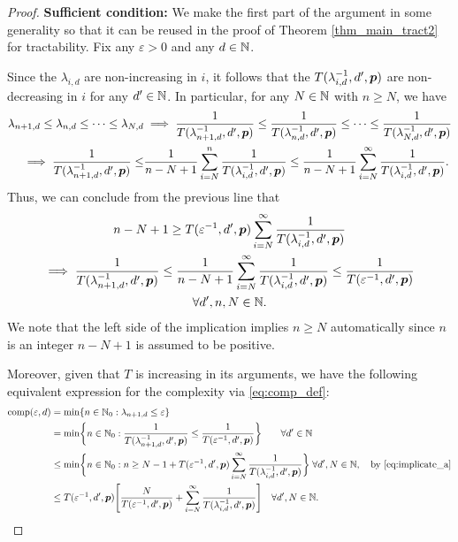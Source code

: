 \documentclass[11pt,a4paper]{article}
\begin{document}
\begin{proof}
\textbf{Sufficient condition:}\newline
We make the first part of the argument in some generality so that it can be reused in the proof of Theorem \ref{thm_main_tract2} for tractability.  Fix any $\varepsilon > 0$ and any $d \in \mathbb{N}$.

Since the $\lambda_{i,d}$ are non-increasing in $i$, it follows that the $T(\lambda_{i,d}^{-1},d',\boldsymbol{p})$ are non-decreasing in $i$ for any $d'\in\mathbb{N}$. In particular, for  any $N\in\mathbb{N}$ with $n\ge N$, we have
\begin{align*}
    \lambda_{n+1,d} \le \lambda_{n,d} \le \cdots \le \lambda_{N,d}
    & \implies \frac{1}{T(\lambda_{n+1, d}^{-1},d',\boldsymbol{p})} \le \frac{1}{T(\lambda_{n, d}^{-1},d',\boldsymbol{p})} \le \cdots \le \frac{1}{T(\lambda_{N, d}^{-1},d',\boldsymbol{p})} \\
     \implies \frac{1}{T(\lambda_{n+1, d}^{-1},d',\boldsymbol{p}) }
    \le &\frac{1}{n-N+1} \sum_{i=N}^n  \frac{1}{T(\lambda_{i, d}^{-1},d',\boldsymbol{p}) }
    \le \frac{1}{n-N+1} \sum_{i=N}^\infty  \frac{1}{T(\lambda_{i, d}^{-1},d',\boldsymbol{p})}.
\end{align*}
Thus, we can conclude from the previous line that
\begin{multline} \label{eq:implicate_a}
    n - N +1 \ge T(\varepsilon^{-1},d',\boldsymbol{p}) \sum_{i=N}^\infty \frac{1}{T(\lambda_{i, d}^{-1},d',\boldsymbol{p})} \\
   \implies   \frac{1}{T(\lambda_{n+1, d}^{-1},d',\boldsymbol{p})} \le
   \frac{1}{n-N+1} \sum_{i=N}^\infty \frac{1}{T(\lambda_{i, d}^{-1},d',\boldsymbol{p}) } \le \frac{1}{T(\varepsilon^{-1},d',\boldsymbol{p})} \\ \forall d', n, N \in \mathbb{N}.
\end{multline}
We note that the left side of the implication implies $n \ge N$ automatically since $n$ is an integer  $n - N +1$ is assumed to be positive.

Moreover, given that $T$ is increasing in its arguments, we have the following equivalent expression for the complexity via \eqref{eq:comp_def}:
\begin{align} %
	\nonumber
	\comp(\varepsilon, d) & = \min \{n \in \natzero : \lambda_{n+1, d} \le \varepsilon\} \\
	\nonumber
	& = \min \biggl\{n \in \natzero : \frac{1}{T(\lambda_{n+1,d}^{-1},d',\vp)}\le \frac{1}{T(\varepsilon^{-1},d',\vp) }\biggr\} \qquad  \forall d'\in \naturals\\
	\nonumber
	& \le  \min \biggl\{n \in \natzero : n \ge N - 1 + T(\varepsilon^{-1},d',\vp) \sum_{i=N}^\infty \frac{1}{T(\lambda_{i, d}^{-1},d',\vp)} \biggr\} \;  \forall  d', N \in \naturals, \quad \text{by \eqref{eq:implicate_a}} \\ 
	& \le  T(\varepsilon^{-1},d',\vp) \Biggl [\frac{N}{T(\varepsilon^{-1},d',\vp)}  +  \sum_{i=N}^\infty \frac{1}{T(\lambda_{i, d}^{-1},d',\vp)} \Biggr] \quad \forall  d', N \in \naturals. \label{eq:compUP}
\end{align}


\end{proof}
\end{document}
